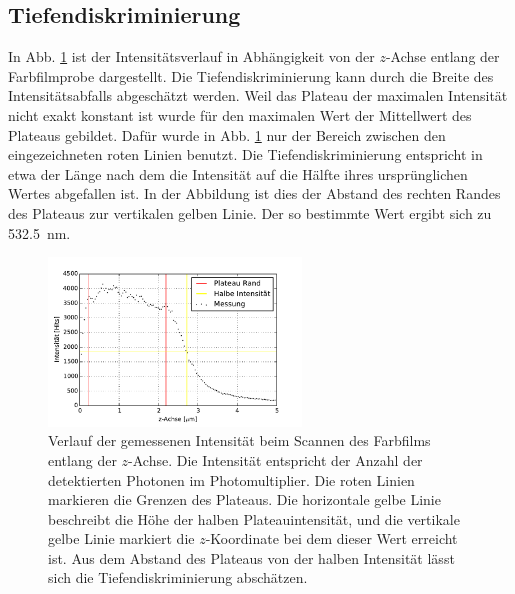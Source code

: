 \subsection{Tiefendiskriminierung}
In Abb. \ref{fig:tiefe} ist der Intensitätsverlauf in Abhängigkeit von der $z$-Achse entlang der Farbfilmprobe dargestellt.
Die Tiefendiskriminierung kann durch die Breite des Intensitätsabfalls abgeschätzt werden.
Weil das Plateau der maximalen Intensität nicht exakt konstant ist wurde für den maximalen Wert der Mittellwert des Plateaus gebildet.
Dafür wurde in Abb. \ref{fig:tiefe} nur der Bereich zwischen den eingezeichneten roten Linien benutzt.
Die Tiefendiskriminierung entspricht in etwa der Länge nach dem die Intensität auf die Hälfte ihres ursprünglichen Wertes abgefallen ist.
In der Abbildung ist dies der Abstand des rechten Randes des Plateaus zur vertikalen gelben Linie.
Der so bestimmte Wert ergibt sich zu 532.5~nm.

\begin{figure}
	\centering
	\includegraphics[width=0.6\textwidth]{plots/tiefe.pdf}
	\caption{Verlauf der gemessenen Intensität beim Scannen des Farbfilms entlang der $z$-Achse. Die Intensität entspricht der Anzahl der detektierten Photonen im Photomultiplier.
		Die roten Linien markieren die Grenzen des Plateaus. 
		Die horizontale gelbe Linie beschreibt die Höhe der halben Plateauintensität, und die vertikale gelbe Linie markiert die $z$-Koordinate bei dem dieser Wert erreicht ist.
		Aus dem Abstand des Plateaus von der halben Intensität lässt sich die Tiefendiskriminierung abschätzen.
	}\label{fig:tiefe}
\end{figure}
\newpage
